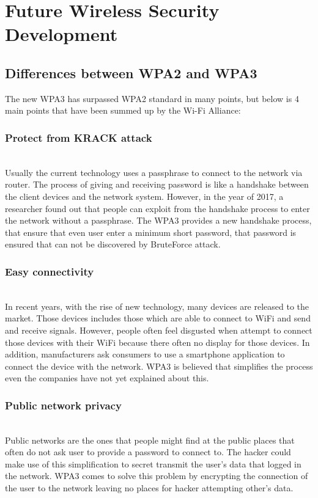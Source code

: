 \section{Future Wireless Security Development}
\subsection{Differences between WPA2 and WPA3 \cite{hoffman_2018}}
The new WPA3 \cite{hoffman_2018} has surpassed WPA2 standard in many points, but below is 4 main points that have been summed up by the Wi-Fi Alliance:
\subsubsection{Protect from KRACK attack}~\\
Usually the current technology uses a passphrase to connect to the network via router. The process of giving and receiving password is like a handshake between the client devices and the network system. However, in the year of 2017, a researcher found out that people can exploit from the handshake process to enter the network without a passphrase.
The WPA3 provides a new handshake process, that ensure that even user enter a minimum short password, that password is ensured that can not be discovered by BruteForce attack.
\subsubsection{Easy connectivity}~\\
In recent years, with the rise of new technology, many devices are released to the market. Those devices includes those which are able to connect to WiFi and send and receive signals. However, people often feel disgusted when attempt to connect those devices with their WiFi because there often no display for those devices. In addition, manufacturers ask consumers to use a smartphone application to connect the device with the network.
WPA3 \cite{hoffman_2018} is believed that simplifies the process even the companies have not yet explained about this.
\subsubsection{Public network privacy}~\\
Public networks are the ones that people might find at the public places that often do not ask user to provide a password to connect to. The hacker could make use of this simplification to secret transmit the user’s data that logged in the network.
WPA3 \cite{hoffman_2018} comes to solve this problem by encrypting the connection of the user to the network leaving no places for hacker attempting other’s data.

